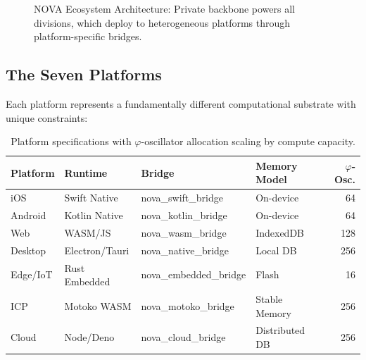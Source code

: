 \documentclass[12pt]{article}
\newcommand{\PHI}{\varphi}
\begin{document}
\begin{figure}[htbp]
\caption{NOVA Ecosystem Architecture: Private backbone powers all divisions, which deploy to heterogeneous platforms through platform-specific bridges.}
\label{fig:ecosystem}
\end{figure}

\subsection{The Seven Platforms}

Each platform represents a fundamentally different computational substrate with unique constraints:

\begin{table}[htbp]
\centering
\small
\begin{tabular}{@{}llllr@{}}
\toprule
\textbf{Platform} & \textbf{Runtime} & \textbf{Bridge} & \textbf{Memory Model} & \textbf{$\PHI$-Osc.} \\
\midrule
iOS & Swift Native & nova\_swift\_bridge & On-device & 64 \\
Android & Kotlin Native & nova\_kotlin\_bridge & On-device & 64 \\
Web & WASM/JS & nova\_wasm\_bridge & IndexedDB & 128 \\
Desktop & Electron/Tauri & nova\_native\_bridge & Local DB & 256 \\
Edge/IoT & Rust Embedded & nova\_embedded\_bridge & Flash & 16 \\
ICP & Motoko WASM & nova\_motoko\_bridge & Stable Memory & 256 \\
Cloud & Node/Deno & nova\_cloud\_bridge & Distributed DB & 256 \\
\bottomrule
\end{tabular}
\caption{Platform specifications with $\PHI$-oscillator allocation scaling by compute capacity.}
\label{tab:platforms}
\end{table}
\end{document}
